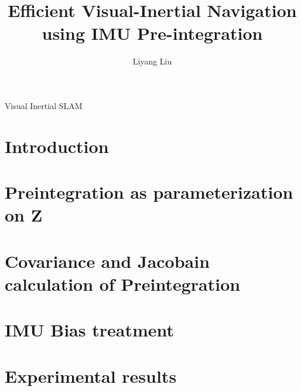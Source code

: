 \documentclass[8pt]{beamer}
\title[Efficient Visual-Inertial Navigation using IMU Pre-integration]{\huge Efficient Visual-Inertial Navigation using IMU Pre-integration}
\author[Liyang Liu]{\large {Liyang} Liu\vskip0.3cm}%
\institute[CAS]{\large Centre for Autonomous Systems\\[0.2cm]University of
  Technology Sydney\vskip0.3cm
}
\begin{document}
\begin{frame}[plain]
  \titlepage
\end{frame}


\begin{frame}{Visual Inertial SLAM}
  \tableofcontents
\end{frame}

\section{Introduction}
\section{Preintegration as parameterization on Z}
\section{Covariance and Jacobain calculation of Preintegration}
\section{IMU Bias treatment}
\section{Experimental results}
\end{document}
